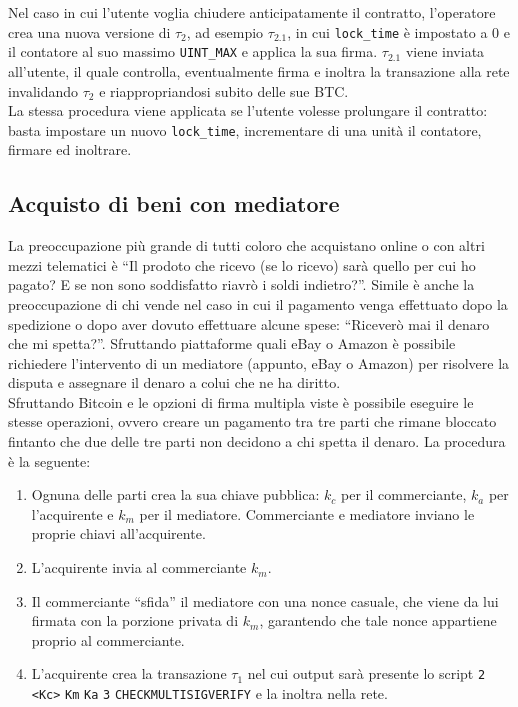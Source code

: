 Nel caso in cui l'utente voglia chiudere anticipatamente il contratto, l'operatore crea una nuova versione di $\tau_2$, ad esempio $\tau_{2.1}$, in cui \verb|lock_time| è impostato a 0 e il contatore al suo massimo \verb|UINT_MAX| e applica la sua firma. $\tau_{2.1}$ viene inviata all'utente, il quale controlla, eventualmente firma e inoltra la transazione alla rete invalidando $\tau_2$ e riappropriandosi subito delle sue BTC.\\
La stessa procedura viene applicata se l'utente volesse prolungare il contratto: basta impostare un nuovo \verb|lock_time|, incrementare di una unità il contatore, firmare ed inoltrare.

\subsection{Acquisto di beni con mediatore}

La preoccupazione più grande di tutti coloro che acquistano online o con altri mezzi telematici è ``Il prodoto che ricevo (se lo ricevo) sarà quello per cui ho pagato? E se non sono soddisfatto riavrò i soldi indietro?''. Simile è anche la preoccupazione di chi vende nel caso in cui il pagamento venga effettuato dopo la spedizione o dopo aver dovuto effettuare alcune spese: ``Riceverò mai il denaro che mi spetta?''. Sfruttando piattaforme quali eBay o Amazon è possibile richiedere l'intervento di un mediatore (appunto, eBay o Amazon) per risolvere la disputa e assegnare il denaro a colui che ne ha diritto.\\
Sfruttando Bitcoin e le opzioni di firma multipla viste è possibile eseguire le stesse operazioni, ovvero creare un pagamento tra tre parti che rimane bloccato fintanto che due delle tre parti non decidono a chi spetta il denaro. La procedura è la seguente:
\begin{enumerate}
    \item Ognuna delle parti crea la sua chiave pubblica: $k_c$ per il commerciante, $k_a$ per l'acquirente e $k_m$ per il mediatore. Commerciante e mediatore inviano le proprie chiavi all'acquirente.
    \item L'acquirente invia al commerciante $k_m$.
    \item Il commerciante ``sfida'' il mediatore con una nonce casuale, che viene da lui firmata con la porzione privata di $k_m$, garantendo che tale nonce appartiene proprio al commerciante.
    \item L'acquirente crea la transazione $\tau_1$ nel cui output sarà presente lo script \verb|2| \verb|<Kc>| \verb|Km| \verb|Ka| \verb|3| \verb|CHECKMULTISIGVERIFY| e la inoltra nella rete.
\end{enumerate}

